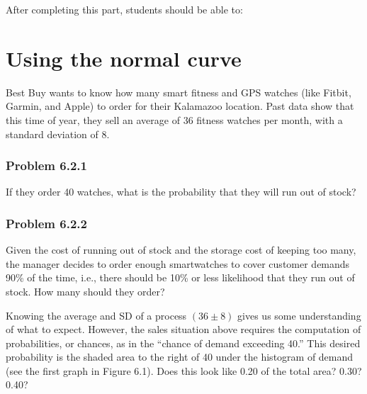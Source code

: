 \documentclass[11pt, chapterprefix=true]{scrbook}\usepackage[]{graphicx}\usepackage[]{color}
\begin{document}
After completing this part, students should be able to:


\section{Using the normal curve} 

Best Buy wants to know how many smart fitness and GPS watches (like Fitbit, Garmin, and Apple) to order for their Kalamazoo location. Past data show that this time of year, they sell an average of 36 fitness watches per month, with a standard deviation of 8.

\subsubsection{Problem 6.2.1}  If they order 40 watches, what is the probability that they will run out of stock?

\subsubsection{Problem 6.2.2}  \label{LBL622} Given the cost of running out of stock and the storage cost of keeping too many, the manager decides to order enough smartwatches to cover customer demands 90\% of the time, i.e., there should be 10\% or less likelihood that they run out of stock. How many should they order?

Knowing the average and SD of a process $(36 \pm 8)$ gives us some understanding of what to expect.  However, the sales situation above requires the computation of probabilities, or chances, as in the ``chance of demand exceeding 40.''   This desired probability is the shaded area to the right of 40 under the histogram of demand (see the first graph in Figure 6.1).  Does this look like 0.20 of the total area?  0.30?  0.40?
\end{document}
